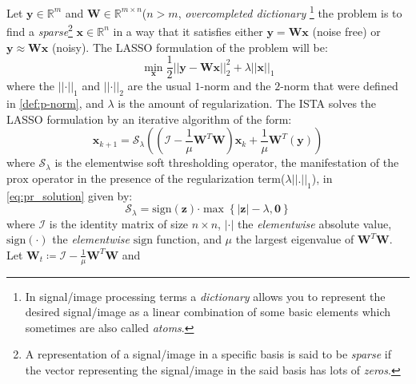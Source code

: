Let $\boldsymbol{y} \in \mathbb{R}^m$ and $\boldsymbol{W} \in \mathbb{R}^{m \times n}$($n > m$, \emph{overcompleted dictionary}
\footnote{In signal/image processing terms a \emph{dictionary} allows you to represent the desired signal/image as a linear combination of some basic elements which sometimes are also called \emph{atoms}.}
the \srp\index{\srp} problem is to find a \emph{sparse}\footnote{A representation of a signal/image in a specific basis is said to be \emph{sparse} if 
the vector representing the signal/image in the said basis has lots of \emph{zeros}.} 
$\boldsymbol{x} \in \mathbb{R}^n$ in a way that it satisfies either $\boldsymbol{y} = \boldsymbol{W}\boldsymbol{x}$ (noise free) or $\boldsymbol{y} \approx \boldsymbol{W}\boldsymbol{x}$ (noisy).
The \ac{LASSO}\cite{Hastie2009} formulation of the problem will be:
\begin{equation}
  \min_{\boldsymbol{x}} \frac{1}{2} \left|\left|\boldsymbol{y}-\boldsymbol{W}\boldsymbol{x}\right|\right|_2^2 + \lambda \left|\left|\boldsymbol{x}\right|\right|_1
\end{equation}
where the $\left|\left|\boldsymbol{\cdot}\right|\right|_1$ and $\left|\left|\boldsymbol{\cdot}\right|\right|_2$ are the usual $1$-norm and the $2$-norm that were defined in \cref{def:p-norm}, and $\lambda$ is the amount of regularization\cite{Hastie2009}. 
The \ac{ISTA}\cite{Daubechies2003} solves the \ac{LASSO}\cite{Hastie2009} formulation by an iterative algorithm of the form:
\begin{equation}
  \boldsymbol{x}_{k+1} = \mathcal{S}_\lambda\left(\left(\mathcal{I}-\frac{1}{\mu}\boldsymbol{W}^T\boldsymbol{W}\right)\boldsymbol{x}_k+\frac{1}{\mu}\boldsymbol{W}^T\left(\boldsymbol{y}\right)\right)
\end{equation}
where $\mathcal{S}_\lambda$ is the elementwise soft thresholding operator, the manifestation of the $\mathrm{prox}$ operator in 
the presence of the regularization term($\lambda\left|\left|\boldsymbol{.}\right|\right|_1$), in \cref{eq:pr_solution} given by:
\begin{equation}
  \mathcal{S}_\lambda = \mathrm{sign}(\boldsymbol{z}) \boldsymbol{\cdot} \max \left\{\left|\boldsymbol{z}\right|-\lambda,\boldsymbol{0}\right\}
\end{equation}
where $\mathcal{I}$ is the identity matrix of size $n \times n$, $\left|\boldsymbol{\cdot}\right|$ the \emph{elementwise} absolute value, 
$\mathrm{sign}(\boldsymbol{\cdot})$ the \emph{elementwise} $\mathrm{sign}$ function, and $\mu$ the largest eigenvalue of $\boldsymbol{W}^T\boldsymbol{W}$. Let $\boldsymbol{W}_t \coloneqq \mathcal{I}-\frac{1}{\mu}\boldsymbol{W}^T\boldsymbol{W}$ and 
